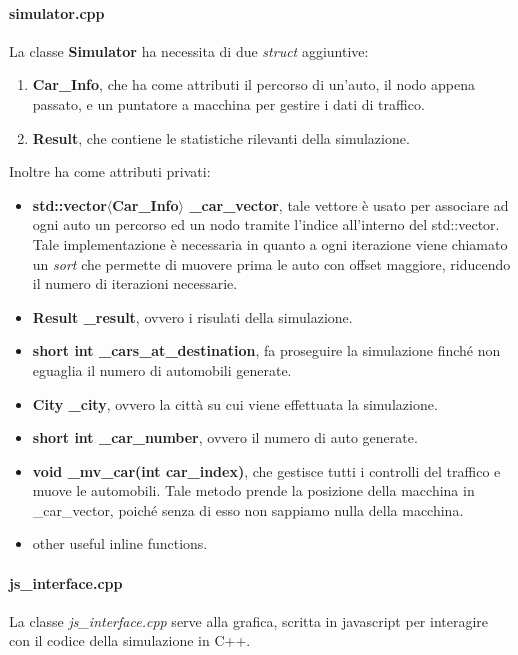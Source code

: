 \documentclass{article}
\newcommand{\bb}[1]{\textbf{#1}}
\newcommand{\ii}[1]{\textit{#1}}
\begin{document}
        \paragraph{simulator.cpp}
            La classe \bb{Simulator} ha necessita di due \ii{struct} aggiuntive:
            \begin{enumerate}
                \item \bb{Car\_Info}, che ha come attributi il percorso di un'auto, il nodo appena passato, e un puntatore a macchina per gestire i dati di traffico.
                \item \bb{Result}, che contiene le statistiche rilevanti della simulazione.
            \end{enumerate}
            Inoltre ha come attributi privati:
            \begin{itemize}
                \item \bb{std::vector$\langle$Car\_Info$\rangle$ \_car\_vector}, tale vettore è usato per associare ad ogni auto un percorso ed un nodo tramite l'indice 
                    all'interno del std::vector. Tale implementazione è necessaria in quanto a ogni iterazione viene chiamato un \ii{sort} che permette di 
                    muovere prima le auto con offset maggiore, riducendo il numero di iterazioni necessarie.
                \item \bb{Result \_result}, ovvero i risulati della simulazione.
                \item \bb{short int \_cars\_at\_destination}, fa proseguire la simulazione finché non eguaglia il numero di automobili generate.
                \item \bb{City \_city}, ovvero la città su cui viene effettuata la simulazione.
                \item \bb{short int \_car\_number}, ovvero il numero di auto generate.
                \item \bb{void \_mv\_car(int car\_index)}, che gestisce tutti i controlli del traffico e muove le automobili.
                    Tale metodo prende la posizione della macchina in \_car\_vector, poiché senza di esso non sappiamo nulla della macchina.
                \item other useful inline functions.
            \end{itemize}
        \paragraph{js\_interface.cpp} 
            La classe \ii{js\_interface.cpp} serve alla grafica, scritta in javascript per interagire con il codice della simulazione in C++.
\end{document}
